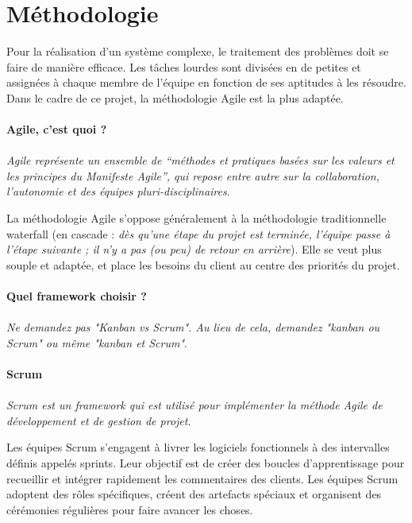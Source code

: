        
        \section{Méthodologie}
        Pour la réalisation d'un système complexe, le traitement des problèmes doit se faire 
        de manière efficace. Les tâches lourdes sont divisées en de petites et assignées 
        à chaque membre de l'équipe  en fonction de ses aptitudes à les résoudre. Dans le cadre de ce projet,
        la méthodologie Agile est la plus adaptée.

        \paragraph{Agile, c'est quoi ?}
        \paragraph{}
        \textit{Agile représente un ensemble de “méthodes et pratiques basées sur 
        les valeurs et les principes du Manifeste Agile”, qui repose entre autre sur 
        la collaboration, l’autonomie et des équipes pluri-disciplinaires}\cite{Littlefield2017}.
        \par
        La méthodologie Agile s'oppose généralement à la méthodologie traditionnelle waterfall (en cascade :
        \textit{dès qu'une étape du projet est terminée, l'équipe passe à l'étape suivante ; il n'y a pas (ou peu) 
        de retour en arrière}\cite{david2017}). Elle se veut plus souple 
        et adaptée, et place les besoins du client au centre des priorités du projet.

        \paragraph{Quel framework choisir ?}
        \paragraph{}
        \textit{Ne demandez pas "Kanban vs Scrum". Au lieu de cela, demandez "kanban ou Scrum" 
        ou même "kanban et Scrum"}\cite{Rehkopf}.
        \par
        \paragraph{Scrum}
        \paragraph{}
        \textit{Scrum est un framework qui est utilisé pour implémenter la méthode 
        Agile de développement et de gestion de projet}\cite{Littlefield2017}.
        \par
        Les équipes Scrum s'engagent à livrer les logiciels fonctionnels à des intervalles définis 
        appelés sprints. Leur objectif est de créer des boucles d'apprentissage pour 
        recueillir et intégrer rapidement les commentaires des clients. Les équipes Scrum 
        adoptent des rôles spécifiques, créent des artefacts spéciaux et organisent des cérémonies 
        régulières pour faire avancer les choses. 
        
